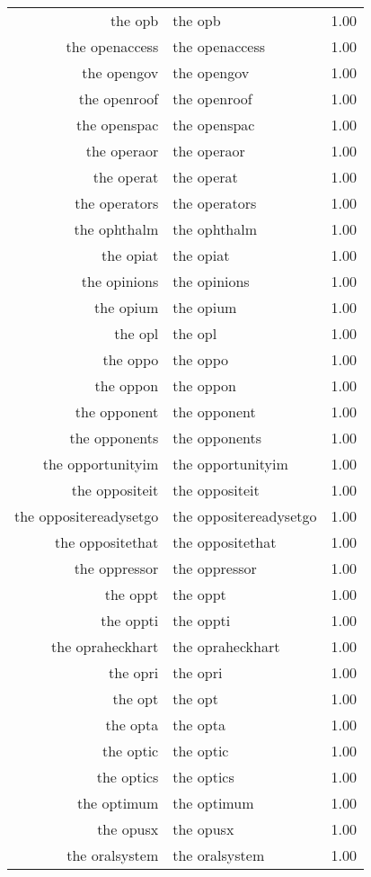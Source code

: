 \begin{table}[ht]
\begin{tabular}{rlr}
  the opb & the opb & 1.00 \\ 
  the openaccess & the openaccess & 1.00 \\ 
  the opengov & the opengov & 1.00 \\ 
  the openroof & the openroof & 1.00 \\ 
  the openspac & the openspac & 1.00 \\ 
  the operaor & the operaor & 1.00 \\ 
  the operat & the operat & 1.00 \\ 
  the operators & the operators & 1.00 \\ 
  the ophthalm & the ophthalm & 1.00 \\ 
  the opiat & the opiat & 1.00 \\ 
  the opinions & the opinions & 1.00 \\ 
  the opium & the opium & 1.00 \\ 
  the opl & the opl & 1.00 \\ 
  the oppo & the oppo & 1.00 \\ 
  the oppon & the oppon & 1.00 \\ 
  the opponent & the opponent & 1.00 \\ 
  the opponents & the opponents & 1.00 \\ 
  the opportunityim & the opportunityim & 1.00 \\ 
  the oppositeit & the oppositeit & 1.00 \\ 
  the oppositereadysetgo & the oppositereadysetgo & 1.00 \\ 
  the oppositethat & the oppositethat & 1.00 \\ 
  the oppressor & the oppressor & 1.00 \\ 
  the oppt & the oppt & 1.00 \\ 
  the oppti & the oppti & 1.00 \\ 
  the opraheckhart & the opraheckhart & 1.00 \\ 
  the opri & the opri & 1.00 \\ 
  the opt & the opt & 1.00 \\ 
  the opta & the opta & 1.00 \\ 
  the optic & the optic & 1.00 \\ 
  the optics & the optics & 1.00 \\ 
  the optimum & the optimum & 1.00 \\ 
  the opusx & the opusx & 1.00 \\ 
  the oralsystem & the oralsystem & 1.00 \\ 

\end{tabular}
\end{table}
